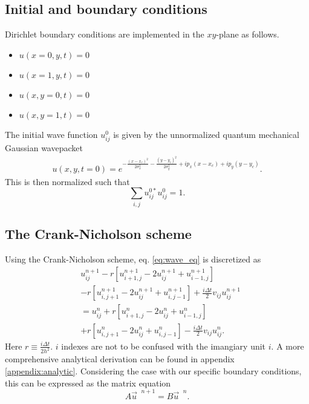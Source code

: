 \documentclass[english,notitlepage,reprint,nofootinbib]{revtex4-1}  %
\begin{document}
\subsection*{Initial and boundary conditions}
Dirichlet boundary conditions are implemented in the $xy$-plane as follows.
\begin{itemize}
    \item $u(x=0,y,t) = 0$
    \item $u(x=1,y,t) = 0$
    \item $u(x,y=0,t) = 0$
    \item $u(x,y=1,t) = 0$
\end{itemize}

The initial wave function $u_{ij}^0$ is given by the unnormalized quantum mechanical Gaussian wavepacket
\begin{align}
    u(x,y,t = 0) = e^{-\frac{(x-x_c)^2}{2 \sigma_x^2} -\frac{(y-y_c)^2}{2 \sigma_y^2}+ ip_x (x-x_c)+ ip_y (y-y_c)}.
\end{align}
This is then normalized such that
\begin{equation}
    \sum_{i,j} u_{ij}^{0*} u_{ij}^0 = 1.
\end{equation}

\subsection*{The Crank-Nicholson scheme}
Using the Crank-Nicholson scheme, eq. \ref{eq:wave_eq} is discretized as
\begin{align}
    &u_{ij}^{n+1} - r \left[ u_{i+1,j}^{n+1}- 2 u_{ij}^{n+1} + u_{i-1,j}^{n+1} \right] \\
    &- r \left[ u_{i,j+1}^{n+1}- 2 u_{ij}^{n+1} + u_{i,j-1}^{n+1} \right]
    + \frac{i \Delta t}{2} v_{ij} u_{ij}^{n+1} \\
    &= u_{ij}^n 
    + r \left[ u_{i+1,j}^{n}- 2 u_{ij}^{n} + u_{i-1,j}^{n} \right] \\
    &+ r \left[ u_{i,j+1}^{n}- 2 u_{ij}^{n} + u_{i,j-1}^{n} \right]
    - \frac{i \Delta t}{2} v_{ij} u_{ij}^{n}.
\end{align}
Here $r \equiv \frac{i \Delta t}{2h^2}$. $i$ indexes are not to be confused with the imangiary unit $i$. A more comprehensive analytical derivation can be found in appendix \ref{appendix:analytic}. Considering the case with our specific boundary conditions, this can be expressed as the matrix equation
\begin{equation}
    A \vec{u}^{\text{ }n+1} = B \vec{u}^{\text{ }n}.
\end{equation}
\end{document}
